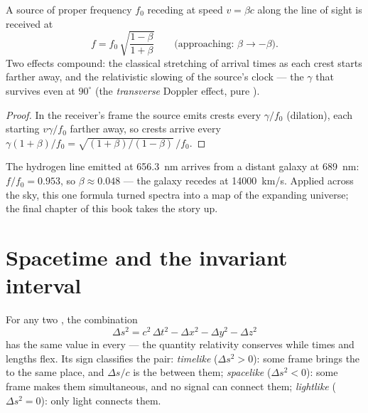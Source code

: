 \begin{proposition}\label{prop:b3:relativistic-kinematics:doppler}
A source of proper frequency $f_0$ receding at speed $v = \beta c$
along the line of sight is received at
\[
f = f_0\,\sqrt{\frac{1 - \beta}{1 + \beta}}
\qquad
\text{(approaching: } \beta \to -\beta\text{)} .
\]
Two effects compound: the classical stretching of arrival times as
each crest starts farther away, and the relativistic slowing of the
source's clock --- the $\gamma$ that survives even at $90^\circ$ (the
\emph{transverse} Doppler effect, pure ).
\end{proposition}

\begin{proof}
In the receiver's frame the source emits crests every
$\gamma/f_0$ (dilation), each starting $v\gamma/f_0$ farther away, so
crests arrive every $\gamma(1 + \beta)/f_0 = \sqrt{(1+\beta)/
(1-\beta)}\,/f_0$.
\end{proof}

\begin{example}\label{ex:b3:relativistic-kinematics:redshift}
The hydrogen line emitted at \qty{656.3}{nm} arrives from a distant
galaxy at \qty{689}{nm}: $f/f_0 = 0.953$, so $\beta \approx 0.048$ ---
the galaxy recedes at \qty{14000}{km/s}. Applied across the sky, this
one formula turned spectra into a map of the expanding universe; the
final chapter of this book takes the story up.
\end{example}

\section{Spacetime and the invariant interval}

\begin{theorem}\label{thm:b3:relativistic-kinematics:interval}
For any two , the combination
\[
\Delta s^2 = c^2\,\Delta t^2 - \Delta x^2 - \Delta y^2 - \Delta z^2
\]
has the same value in every  --- the quantity relativity
conserves while times and lengths flex. Its sign classifies the pair:
\emph{timelike} ($\Delta s^2 > 0$): some frame brings the  to
the same place, and $\Delta s/c$ is the  between them;
\emph{spacelike} ($\Delta s^2 < 0$): some frame makes them
simultaneous, and no signal can connect them; \emph{lightlike}
($\Delta s^2 = 0$): only light connects them.
\end{theorem}

